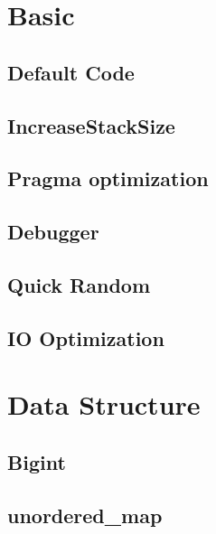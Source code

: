 \documentclass[a4paper,10pt,twocolumn,oneside]{article}
\begin{document}
\pagestyle{fancy}
\fancyfoot{}
\fancyhead[R]{\thepage}
\renewcommand{\headrulewidth}{0.4pt}
\renewcommand{\contentsname}{Contents} 

\scriptsize
\tableofcontents

\newpage

\section{Basic}
\subsection{Default Code}

\subsection{IncreaseStackSize}

\subsection{Pragma optimization}

\subsection{Debugger}

\subsection{Quick Random}

\subsection{IO Optimization}


\section{Data Structure}
\subsection{Bigint}

\subsection{unordered\_map}

\end{document}
